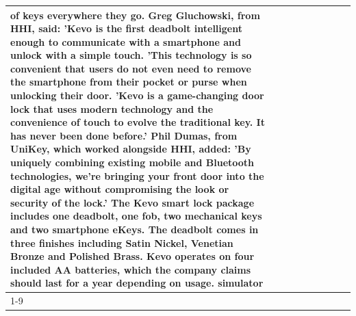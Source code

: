 \begin{table}[H]
\begin{tabular}{lllrlllll}
of keys everywhere they go. Greg Gluchowski, from HHI, said: 'Kevo is the first deadbolt intelligent enough to communicate with a smartphone and unlock with a simple touch. 'This technology is so convenient that users do not even need to remove the smartphone from their pocket or purse when unlocking their door. 'Kevo is a game-changing door lock that uses modern technology and the convenience of touch to evolve the traditional key. It has never been done before.' Phil Dumas, from UniKey, which worked alongside HHI, added: 'By uniquely combining existing mobile and Bluetooth technologies, we’re bringing your front door into the digital age without compromising the look or security of the lock.' The Kevo smart lock package includes one deadbolt, one fob, two mechanical keys and two smartphone eKeys. The deadbolt comes in three finishes including Satin Nickel, Venetian Bronze and Polished Brass. Kevo operates on four included AA batteries, which the company claims should last for a year depending on usage. simulator \\
\cline{1-9}

\end{tabular}
\end{table}
